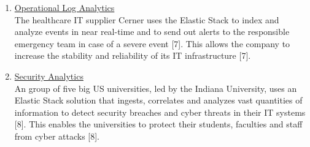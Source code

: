 \begin{enumerate}
    \item \underline{Operational Log Analytics} \\
    The healthcare IT supplier Cerner uses the Elastic Stack to index and analyze events in near real-time and to send out alerts to the responsible emergency team in case of a severe event [7]. This allows the company to increase the stability and reliability of its IT infrastructure [7]. 
    
    \item \underline{Security Analytics} \\
    An group of five big US universities, led by the Indiana University, uses an Elastic Stack solution that ingests, correlates and analyzes vast quantities of information to detect security breaches and cyber threats in their IT systems [8]. This enables the universities to protect their students, faculties and staff from cyber attacks [8].

\end{enumerate}
